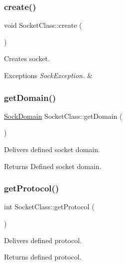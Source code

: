 \subsubsection{\texorpdfstring{create()}{create()}}
{\footnotesize\ttfamily void Socket\+Class\+::create (\begin{DoxyParamCaption}{ }\end{DoxyParamCaption})\hspace{0.3cm}{\ttfamily [protected]}}

Creates socket. 
\begin{DoxyExceptions}{Exceptions}
{\em Sock\+Exception.} & \\
\hline
\end{DoxyExceptions}
\mbox{\label{classSocketClass_a688a08cbfa372250ee43af869c75965e}} 
\subsubsection{\texorpdfstring{get\+Domain()}{getDomain()}}
{\footnotesize\ttfamily \hyperlink{classSocketClass_ac940413abaa7328db8518a9f121babb6}{Sock\+Domain} Socket\+Class\+::get\+Domain (\begin{DoxyParamCaption}{ }\end{DoxyParamCaption})\hspace{0.3cm}{\ttfamily [inline]}}

Delivers defined socket domain. \begin{DoxyReturn}{Returns}
Defined socket domain. 
\end{DoxyReturn}
\mbox{\label{classSocketClass_ad325d4555d76b15490d3f336bbe7c420}} 
\subsubsection{\texorpdfstring{get\+Protocol()}{getProtocol()}}
{\footnotesize\ttfamily int Socket\+Class\+::get\+Protocol (\begin{DoxyParamCaption}{ }\end{DoxyParamCaption})\hspace{0.3cm}{\ttfamily [inline]}}

Delivers defined protocol. \begin{DoxyReturn}{Returns}
defined protocol. 
\end{DoxyReturn}
\mbox{\label{classSocketClass_a15c1b7310583c7d671c6800ebb3c87e6}} 
